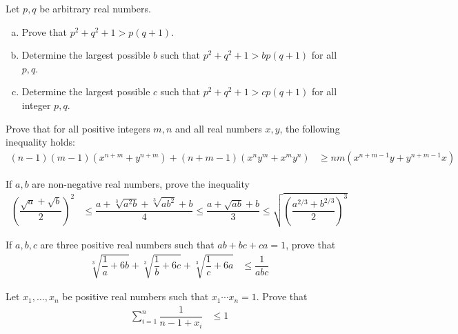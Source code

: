 \documentclass{subfile}
\begin{document}
		\begin{problem}
			Let $p,q$ be arbitrary real numbers.
				\begin{enumerate}[(a)]
					\item Prove that $p^2+q^2+1>p(q+1)$.
					\item Determine the largest possible $b$ such that $p^{2}+q^{2}+1>bp(q+1)$ for all $p,q$.
					\item Determine the largest possible $c$ such that $p^{2}+q^{2}+1>cp(q+1)$ for all integer $p,q$.
				\end{enumerate}
		\end{problem}
	
		\begin{problem}
			Prove that for all positive integers $m,n$ and all real numbers $x,y$, the following inequality holds:
				\begin{align*}
					(n-1)(m-1)\left(x^{n+m}+y^{n+m}\right)+(n+m-1)\left(x^{n}y^{m}+x^{m}y^{n}\right)
						& \geq nm\left(x^{n+m-1}y+y^{n+m-1}x\right)
				\end{align*}
		\end{problem}
	
		\begin{problem}
			If $a,b$ are non-negative real numbers, prove the inequality
				\begin{align*}
					\left(\dfrac{\sqrt{a}+\sqrt{b}}{2}\right)^{2}
						& \leq \dfrac{a+\sqrt[3]{a^{2}b}+\sqrt[3]{ab^{2}}+b}{4}\leq\dfrac{a+\sqrt{ab}+b}{3}\leq\sqrt{\left(\dfrac{a^{2/3}+b^{2/3}}{2}\right)^{3}}
				\end{align*}
		\end{problem}
	
		\begin{problem}
			If $a,b,c$ are three positive real numbers such that $ab+bc+ca=1$, prove that
				\begin{align*}
					\sqrt[3]{\dfrac{1}{a}+6b}+\sqrt[3]{\dfrac{1}{b}+6c}+\sqrt[3]{\dfrac{1}{c}+6a}
						& \leq\dfrac{1}{abc}
				\end{align*}
		\end{problem}
	
		\begin{problem}
			Let $x_{1},\ldots,x_{n}$ be positive real numbers such that $x_{1}\cdots x_{n}=1$. Prove that
				\begin{align*}
					\sum_{i=1}^{n}\dfrac{1}{n-1+x_{i}}
						& \leq1
				\end{align*}
		\end{problem}
	
\end{document}
